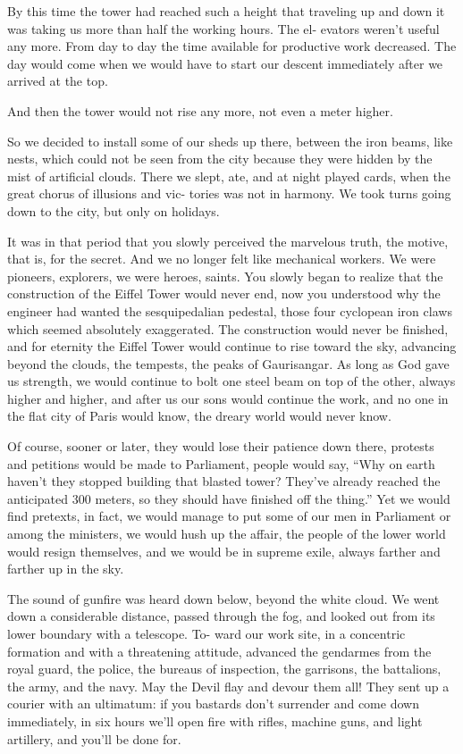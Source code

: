\documentclass[12pt]{article}
\begin{document}
By this time the tower had reached such a height that traveling up
and down it was taking us more than half the working hours. The el-
evators weren’t useful any more. From day to day the time available
for productive work decreased. The day would come when we would
have to start our descent immediately after we arrived at the top.

And then the tower would not rise any more, not even a meter higher.

So we decided to install some of our sheds up there, between the
iron beams, like nests, which could not be seen from the city because
they were hidden by the mist of artificial clouds. There we slept, ate,
and at night played cards, when the great chorus of illusions and vic-
tories was not in harmony. We took turns going down to the city, but
only on holidays.

It was in that period that you slowly perceived the marvelous
truth, the motive, that is, for the secret. And we no longer felt like
mechanical workers. We were pioneers, explorers, we were heroes,
saints. You slowly began to realize that the construction of the Eiffel
Tower would never end, now you understood why the engineer had
wanted the sesquipedalian pedestal, those four cyclopean iron claws
which seemed absolutely exaggerated. The construction would
never be finished, and for eternity the Eiffel Tower would continue to
rise toward the sky, advancing beyond the clouds, the tempests, the
peaks of Gaurisangar. As long as God gave us strength, we would
continue to bolt one steel beam on top of the other, always higher and
higher, and after us our sons would continue the work, and no one in
the flat city of Paris would know, the dreary world would never
know.

Of course, sooner or later, they would lose their patience down
there, protests and petitions would be made to Parliament, people
would say, “Why on earth haven't they stopped building that blasted
tower? They’ve already reached the anticipated 300 meters, so they
should have finished off the thing.” Yet we would find pretexts, in
fact, we would manage to put some of our men in Parliament or
among the ministers, we would hush up the affair, the people of the
lower world would resign themselves, and we would be in supreme
exile, always farther and farther up in the sky.

The sound of gunfire was heard down below, beyond the white
cloud. We went down a considerable distance, passed through the
fog, and looked out from its lower boundary with a telescope. To-
ward our work site, in a concentric formation and with a threatening
attitude, advanced the gendarmes from the royal guard, the police,
the bureaus of inspection, the garrisons, the battalions, the army, and
the navy. May the Devil flay and devour them all!
They sent up a courier with an ultimatum: if you bastards don’t
surrender and come down immediately, in six hours we'll open fire
with rifles, machine guns, and light artillery, and you'll be done for.
\end{document}
